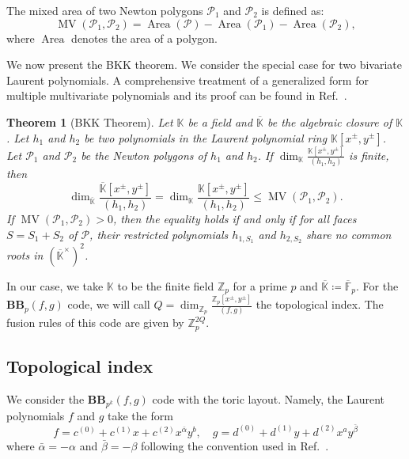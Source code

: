 \documentclass[aps,prb,english,superscriptaddress,twocolumn,tightenlines,showpacs,longbibliography,floatfix,amsfonts]{revtex4-2}
\newtheorem{thm}{Theorem}
\begin{document}
The mixed area of two Newton polygons $\mathscr{P}_1$ and $\mathscr{P}_2$ is defined as:
\begin{equation}
    \operatorname{MV}(\mathscr{P}_1,\mathscr{P}_2)=\operatorname{Area}(\mathscr{P})-\operatorname{Area}(\mathscr{P}_1)-\operatorname{Area}(\mathscr{P}_2),
\end{equation}
where $\operatorname{Area}$ denotes the area of a polygon. 
  
We now present the BKK theorem. We consider the special case for two bivariate Laurent polynomials. A comprehensive treatment of a generalized form for multiple multivariate polynomials and its proof can be found in Ref.~\cite{Gorantla2021}.
\begin{thm}[BKK Theorem]
    Let $\mathbb{K}$ be a field and $\overline{\mathbb{K}}$ be the algebraic closure of $\mathbb{K}$. Let $h_1$ and $h_2$ be two polynomials in the Laurent polynomial ring $\mathbb{K}[x^\pm,y^\pm]$. Let $\mathscr{P}_1$ and $\mathscr{P}_2$ be the Newton polygons of $h_1$ and $h_2$. If $\dim_{\mathbb{K}}\frac{\mathbb{K}[x^\pm,y^\pm]}{(h_1,h_2)}$ is finite, then
    \begin{equation}
        \dim_{\overline{\mathbb{K}}}\frac{\overline{\mathbb{K}}[x^\pm,y^\pm]}{(h_1,h_2)}=\dim_{\mathbb{K}}\frac{\mathbb{K}[x^\pm,y^\pm]}{(h_1,h_2)}\leq\operatorname{MV}(\mathscr{P}_1,\mathscr{P}_2).
    \end{equation}
    If $\operatorname{MV}(\mathscr{P}_1,\mathscr{P}_2)>0$, then the equality holds if and only if for all faces $S=S_1+S_2$ of $\mathscr{P}$, their restricted polynomials $h_{1, S_1}$ and $h_{2, S_2}$ share no common roots in $(\overline{\mathbb{K}}^\times)^2$.
\end{thm}
In our case, we take $\mathbb{K}$ to be the finite field $\mathbb{Z}_p$ for a prime $p$ and $\overline{\mathbb{K}}\coloneqq\overline{\mathbb{F}}_p$. For the $\mathbf{BB}_{p}(f,g)$ code, we will call $Q=\dim_{\mathbb{Z}_p}\frac{\mathbb{Z}_p[x^{\pm},y^{\pm}]}{(f,g)}$ the topological index. The fusion rules of this code are given by $\mathbb{Z}_p^{2Q}$.



\subsection{Topological index}

We consider the $\mathbf{BB}_{p^k}(f,g)$ code with the toric layout. Namely, the Laurent polynomials $f$ and $g$ take the form
\begin{equation}
    f=c^{(0)}+c^{(1)}x+c^{(2)}x^{\bar{\alpha}}y^b,\quad g=d^{(0)}+d^{(1)}y+d^{(2)}x^ay^{\bar{\beta}}
\end{equation}
where $\bar{\alpha}=-\alpha$ and $\bar{\beta}=-\beta$ following the convention used in Ref.~\cite{Chen2025}. 
\end{document}
